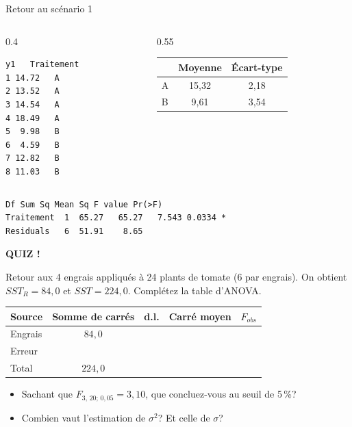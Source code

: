 \documentclass{BeamerTemplate}
\begin{document}
\begin{frame}[fragile,t]{Retour au scénario 1}

\begin{columns}[T]
\begin{column}{0.4\textwidth}
\begin{Verbatim}[fontsize=\scriptsize]
     y1   Traitement
1 14.72   A
2 13.52   A
3 14.54   A
4 18.49   A
5  9.98   B
6  4.59   B
7 12.82   B
8 11.03   B
\end{Verbatim}
\end{column}
\begin{column}{0.55\textwidth}
\begin{tabular}{lcc}
\toprule
 & Moyenne & Écart-type\\
\midrule
A & 15,32 & 2,18\\
B & 9,61  & 3,54\\
\bottomrule
\end{tabular}
\end{column}
\end{columns}

\medskip
\begin{Verbatim}[fontsize=\scriptsize]
           Df Sum Sq Mean Sq F value Pr(>F)
Traitement  1  65.27   65.27   7.543 0.0334 *
Residuals   6  51.91    8.65
\end{Verbatim}


\end{frame}

\begin{frame}[plain,t]
  \centerline{\LARGE\bfseries\alert{QUIZ !}}

  \medskip
  Retour aux 4 engrais appliqués à 24 plants de tomate (6 par engrais).
  On obtient $SST_R=84{,}0$ et $SST=224{,}0$. Complétez la table d'ANOVA.

  \begin{center}
  \renewcommand{\arraystretch}{1.5}
  \begin{tabular}{lcccc}
  \toprule
  Source & Somme de carrés & d.l. & Carré moyen & $F_{obs}$\\
  \midrule
  Engrais & $84{,}0$ & \hspace{1cm} & \hspace{1.5cm} & \hspace{1cm}\\
  Erreur  & & & & \\
  \midrule
  Total   & $224{,}0$ & & & \\
  \bottomrule
  \end{tabular}
  \end{center}

  \begin{itemize}\itemsep 0.9cm
    \item Sachant que $F_{3,\,20;\,0{,}05}=3{,}10$, que concluez-vous au seuil de 5\,\%?
    \item Combien vaut l'estimation de $\sigma^2$? Et celle de $\sigma$?
  \end{itemize}
\end{frame}
\end{document}
